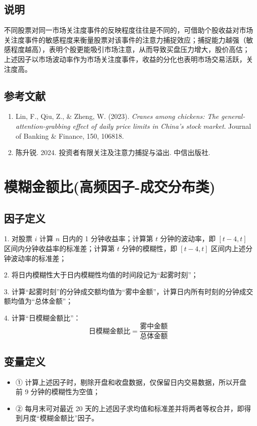 \documentclass{article}
\begin{document}
\subsection{说明}
不同股票对同一市场关注度事件的反映程度往往是不同的，可借助个股收益对市场关注度事件的敏感程度来衡量股票对该事件的注意力捕捉效应；捕捉能力越强（敏感程度越高），表明个股更能吸引市场注意，从而导致买盘压力增大，股价高估；上述因子以市场波动率作为市场关注度事件，收益的分化也表明市场交易活跃，关注度高。

\subsection{参考文献}
\begin{enumerate}
    \item Lin, F., Qiu, Z., \& Zheng, W. (2023). \textit{Cranes among chickens: The general-attention-grabbing effect of daily price limits in China's stock market}. Journal of Banking \& Finance, 150, 106818.
    \item 陈升锐. 2024. 投资者有限关注及注意力捕捉与溢出. 中信出版社.
\end{enumerate}

\section{模糊金额比(高频因子-成交分布类)}

\subsection{因子定义}

1. 对股票 \( i \) 计算 \( n \) 日内的 1 分钟收益率；计算第 \( t \) 分钟的波动率，即 \([t-4, t]\) 区间内分钟收益率的标准差；计算第 \( t \) 分钟的模糊性，即 \([t-4, t]\) 区间内上述分钟波动率的标准差；

2. 将日内模糊性大于日内模糊性均值的时间段记为“起雾时刻”；

3. 计算“起雾时刻”的分钟成交额均值为“雾中金额”，计算日内所有时刻的分钟成交额均值为“总体金额”；

4. 计算“日模糊金额比”：
\begin{equation}
    \text{日模糊金额比} = \frac{\text{雾中金额}}{\text{总体金额}}
\end{equation}

\subsection{变量定义}
\begin{itemize}
    \item ① 计算上述因子时，剔除开盘和收盘数据，仅保留日内交易数据，所以开盘前 9 分钟的模糊性为空值；
    \item ② 每月末可对最近 20 天的上述因子求均值和标准差并将两者等权合并，即得到月度“模糊金额比”因子。
\end{itemize}
\end{document}
